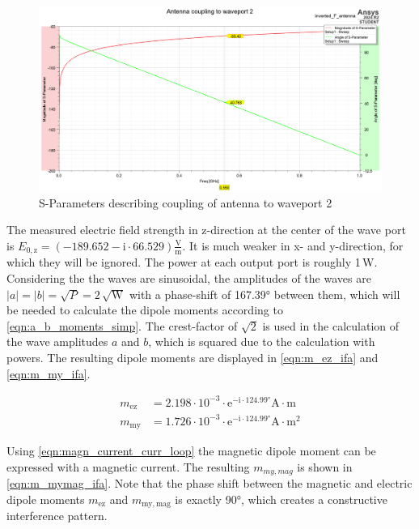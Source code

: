 \begin{figure}[h]
    \centering
    \includegraphics[width=1\linewidth]{Documentation//content//30_simulations//img/antenna_waveport2_sparams.png}
    \caption{S-Parameters describing coupling of antenna to waveport 2}
    \label{fig:antenna_waveport2_sparams}
\end{figure}

The measured electric field strength in z-direction at the center of the wave port is $E_{0,\mathrm{z}}=(-189.652 -\mathrm{i}\cdot66.529)\mathrm{\frac{V}{m}}$. It is much weaker in x- and y-direction, for which they will be ignored. The power at each output port is roughly 1\,W. Considering the the waves are sinusoidal, the amplitudes of the waves are $|a|=|b|=\sqrt{P}=2\,\mathrm{\sqrt{W}}$ with a phase-shift of 167.39° between them, which will be needed to calculate the dipole moments according to \autoref{eqn:a_b_moments_simp}. The crest-factor of $\sqrt{2}$ is used in the calculation of the wave amplitudes $a$ and $b$, which is squared due to the calculation with powers. The resulting dipole moments are displayed in \autoref{eqn:m_ez_ifa} and \autoref{eqn:m_my_ifa}.

\begin{align}
m_{\mathrm{ez}}&=2.198\cdot10^{-3}\cdot\mathrm{e}^{-\mathrm{i}\cdot124.99°}\mathrm{A\cdot m}\label{eqn:m_ez_ifa}\\
m_{\mathrm{my}}&=1.726\cdot10^{-3}\cdot\mathrm{e}^{-\mathrm{i}\cdot 124.99°}\mathrm{A\cdot m^2}\label{eqn:m_my_ifa}
\end{align}

Using \autoref{eqn:magn_current_curr_loop} the magnetic dipole moment can be expressed with a magnetic current. The resulting $m_{my,mag}$ is shown in \autoref{eqn:m_mymag_ifa}. Note that the phase shift between the magnetic and electric dipole moments $m_{\mathrm{ez}}$ and $m_{\mathrm{my,mag}}$ is exactly 90°, which creates a constructive interference pattern.

